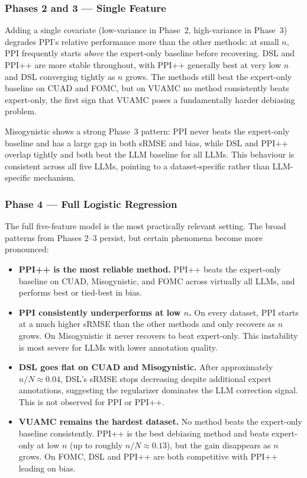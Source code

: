 \subsubsection{Phases 2 and 3 — Single Feature}
\label{sec:exp1-phase23}

Adding a single covariate (low-variance in Phase~2, high-variance in Phase~3) degrades PPI's relative performance more than the other methods: at small $n$, PPI frequently starts \emph{above} the expert-only baseline before recovering. DSL and PPI++ are more stable throughout, with PPI++ generally best at very low $n$ and DSL converging tightly as $n$ grows. The methods still beat the expert-only baseline on CUAD and FOMC, but on VUAMC no method consistently beats expert-only, the first sign that VUAMC poses a fundamentally harder debiasing problem.

Misogynistic shows a strong Phase~3 pattern: PPI never beats the expert-only baseline and has a large gap in both sRMSE and bias, while DSL and PPI++ overlap tightly and both beat the LLM baseline for all LLMs. This behaviour is consistent across all five LLMs, pointing to a dataset-specific rather than LLM-specific mechanism.

\subsubsection{Phase 4 — Full Logistic Regression}
\label{sec:exp1-phase4}

The full five-feature model is the most practically relevant setting. The broad patterns from Phases 2–3 persist, but certain phenomena become more pronounced:

\begin{itemize}
    \item \textbf{PPI++ is the most reliable method.} PPI++ beats the expert-only baseline on CUAD, Misogynistic, and FOMC across virtually all LLMs, and performs best or tied-best in bias.
    \item \textbf{PPI consistently underperforms at low $n$.} On every dataset, PPI starts at a much higher sRMSE than the other methods and only recovers as $n$ grows. On Misogynistic it never recovers to beat expert-only. This instability is most severe for LLMs with lower annotation quality.
    \item \textbf{DSL goes flat on CUAD and Misogynistic.} After approximately $n/N \approx 0.04$, DSL's sRMSE stops decreasing despite additional expert annotations, suggesting the regularizer dominates the LLM correction signal. This is not observed for PPI or PPI++.
    \item \textbf{VUAMC remains the hardest dataset.} No method beats the expert-only baseline consistently. PPI++ is the best debiasing method and beats expert-only at low $n$ (up to roughly $n/N \approx 0.13$), but the gain disappears as $n$ grows. On FOMC, DSL and PPI++ are both competitive with PPI++ leading on bias.
\end{itemize}


